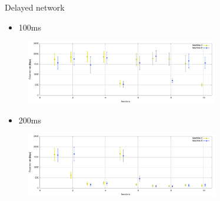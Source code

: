 \documentclass[first=red,second=purple,logo=yellowexc]{aaltoslides}
\begin{document}
\begin{frame}{Delayed network}

\begin{itemize}
\item 100ms
\end{itemize}
\begin{figure}[h]
  \centering
  \includegraphics[width=0.75\textwidth]{100ms_bw.pdf}
\end{figure}
\begin{itemize}
\item 200ms
\end{itemize}
\begin{figure}[h]
  \centering
  \includegraphics[width=0.75\textwidth]{200ms_bw.pdf}
\end{figure}
\end{frame}


%
%

\end{document}
